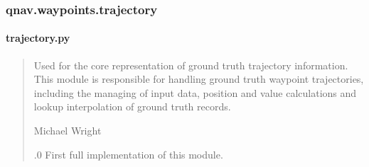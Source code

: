 \documentclass[letterpaper,10pt,english]{sphinxmanual}
\begin{document}
\subsubsection{qnav.waypoints.trajectory}
\label{\detokenize{modules/waypoints/trajectory:module-qnav.waypoints.trajectory}}\label{\detokenize{modules/waypoints/trajectory:qnav-waypoints-trajectory}}\label{\detokenize{modules/waypoints/trajectory::doc}}

\paragraph{trajectory.py}
\label{\detokenize{modules/waypoints/trajectory:trajectory-py}}\begin{quote}\begin{description}
\sphinxAtStartPar
Used for the core representation of ground truth trajectory information.
This module is responsible for handling ground truth waypoint
trajectories, including the managing of input data, position and value
calculations and look\sphinxhyphen{}up interpolation of ground truth records.

\sphinxAtStartPar
Michael Wright \sphinxhyphen{} 

.0 \sphinxhyphen{} First full implementation of this module.

\end{description}\end{quote}
\end{document}
